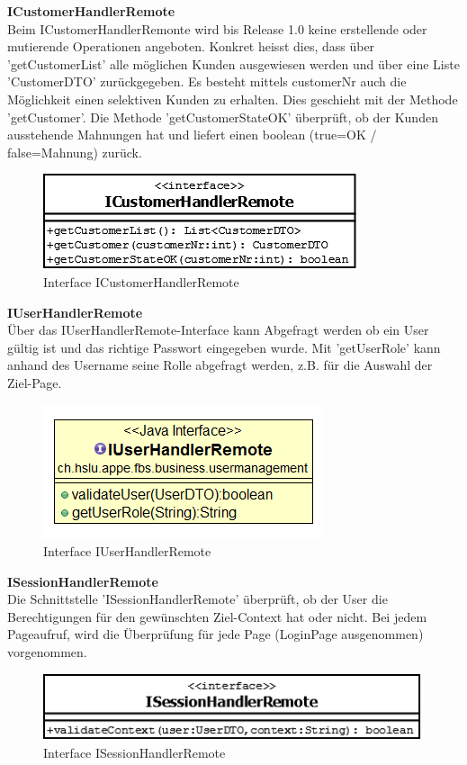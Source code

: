\textbf{ICustomerHandlerRemote}\\
Beim ICustomerHandlerRemonte wird bis Release 1.0 keine erstellende oder mutierende Operationen angeboten. Konkret heisst dies, dass über 'getCustomerList' alle möglichen Kunden ausgewiesen werden und über eine Liste 'CustomerDTO' zurückgegeben. Es besteht mittels customerNr auch die Möglichkeit einen selektiven Kunden zu erhalten. Dies geschieht mit der Methode 'getCustomer'.
Die Methode 'getCustomerStateOK' überprüft, ob der Kunden ausstehende Mahnungen hat und liefert einen boolean (true=OK / false=Mahnung) zurück.
\begin{figure}[H]
	\includegraphics[width=0.4\linewidth]{Images/ICustomerHandlerRemonte}
	\caption{Interface ICustomerHandlerRemote}
	\label{fig:if-ICustomerHandlerRemote}
\end{figure}

\textbf{IUserHandlerRemote}\\
Über das IUserHandlerRemote-Interface kann Abgefragt werden ob ein User gültig ist und das richtige Passwort eingegeben wurde. Mit 'getUserRole' kann anhand des Username seine Rolle abgefragt werden, z.B. für die Auswahl der Ziel-Page. 
\begin{figure}[H]
	\includegraphics[width=0.4\linewidth]{Images/IUserHandlerRemonte}
	\caption{Interface IUserHandlerRemote}
	\label{fig:if-IUserHandlerRemote}
\end{figure}


\textbf{ISessionHandlerRemote}\\
Die Schnittstelle 'ISessionHandlerRemote' überprüft, ob der User die Berechtigungen für den gewünschten Ziel-Context hat oder nicht. Bei jedem Pageaufruf, wird die Überprüfung für jede Page (LoginPage ausgenommen) vorgenommen.
\begin{figure}[H]
	\includegraphics[width=0.5\linewidth]{Images/ISessionHandlerRemonte}
	\caption{Interface ISessionHandlerRemote}
	\label{fig:if-ISessionHandlerRemote}
\end{figure}


